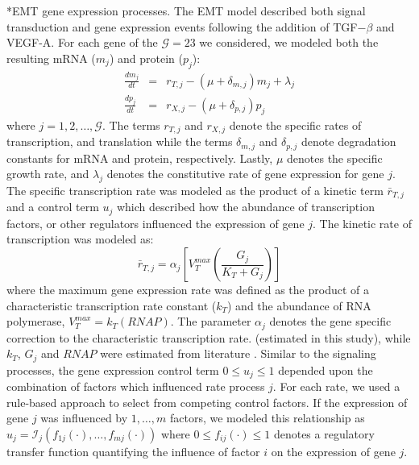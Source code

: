 \documentclass[12pt]{article}
\makeatletter
\renewcommand\subsubsection{\@startsection
	{subsubsection}{2}{0mm}
	{-0.05in}
	{-0.5\baselineskip}
	{\normalfont\normalsize\itshape}}
\makeatother
\begin{document}
\subsubsection*{EMT gene expression processes.}
The EMT model described both signal transduction and gene expression events following the addition of TGF$-\beta$ and VEGF-A.
For each gene of the $\mathcal{G}=23$ we considered, we modeled both the resulting mRNA ($m_{j}$) and protein ($p_{j}$):
\begin{eqnarray}
	\frac{dm_{j}}{dt} &=& r_{T,j} - \left(\mu+\delta_{m,j}\right)m_{j}+\lambda_{j}\\
	\frac{dp_{j}}{dt} &=& r_{X,j} - \left(\mu+\delta_{p,j}\right)p_{j}
\end{eqnarray}where $j=1,2,\dots,\mathcal{G}$.
The terms $r_{T,j}$ and $r_{X,j}$ denote the specific rates of transcription, and translation while
the terms $\delta_{m,j}$ and $\delta_{p,j}$ denote degradation constants for mRNA and protein, respectively.
Lastly, $\mu$ denotes the specific growth rate, and $\lambda_{j}$ denotes the constitutive rate of gene expression for gene $j$.
The specific transcription rate was modeled as the product of a kinetic term $\bar{r}_{T,j}$ and a control term $u_{j}$ which described how the
abundance of transcription factors, or other regulators influenced the expression of gene $j$.
The kinetic rate of transcription was modeled as:
\begin{equation}
	\bar{r}_{T,j} = \alpha_{j}\left[V^{max}_{T}\left(\frac{G_{j}}{K_{T}+G_{j}}\right)\right]
\end{equation}where the maximum gene expression rate was defined as the product of a characteristic transcription rate constant ($k_{T}$)
and the abundance of RNA polymerase, $V^{max}_{T} = k_{T}\left(RNAP\right)$. The parameter $\alpha_{j}$ denotes the gene specific correction to the characteristic transcription rate.
(estimated in this study), while $k_{T}$, $G_{j}$ and $RNAP$ were estimated from literature \citep{Milo:2010aa}.
Similar to the signaling processes, the gene expression control term $0\leq u_{j}\leq 1$ depended upon the combination of factors which influenced rate process $j$.
For each rate, we used a rule-based approach to select from competing control factors.
If the expression of gene $j$ was influenced by $1,\dots,m$ factors, we modeled this relationship as
$u_{j}=\mathcal{I}_{j}\left(f_{1j}\left(\cdot\right),\hdots,f_{mj}\left(\cdot\right)\right)$
where $0\leq f_{ij}\left(\cdot\right)\leq 1$ denotes a regulatory transfer function quantifying the influence of factor $i$ on the expression of gene $j$.
\end{document}
